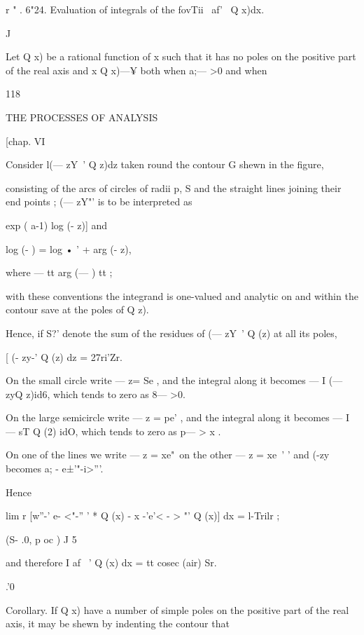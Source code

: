 r "  
.  6"24. Evaluation of integrals of the fovTii \ af'~ Q x)dx. 

J 

Let Q x) be a rational function of x such that it has no poles on the 
positive part of the real axis and x Q x)—¥  both when a;— >0 and when 



118 



THE PROCESSES OF ANALYSIS 



[chap. VI 



Consider l(— zY~'  Q z)dz taken round the contour G shewn in the figure, 



consisting of the arcs of circles of radii 
p, S and the straight lines joining their 
end points ; (— zY"'  is to be interpreted 
as 

exp  ( a-1) log (- z)] 
and 

log (-  ) = log •  ' +   arg (- z), 

where — tt   arg (—  )   tt ; 

with these conventions the integrand is 
one-valued and analytic on and within 
the contour save at the poles of Q  z). 

Hence, if S?' denote the sum of the 
residues of (— zY~'  Q (z) at all its poles, 




[ (- zy-' Q (z) dz = 27ri'Zr. 



On the small circle write — z= Se , and the integral along it becomes 
— I (— zyQ z)id6, which tends to zero as 8— >0. 



On the large semicircle write — z = pe' , and the integral along it becomes 
— I  — sT Q (2) idO, which tends to zero as p— > x . 

On one of the lines we write — z = xe"\ on the other — z = xe~' ' and 
(-zy~  becomes a; - e±'"-i>'''. 

Hence 

lim r [w''-' e- <"-'' ' * Q (x) - x -'e'< - > "' Q (x)] dx = l-Trilr ; 

(S- .0, p oc ) J 5 

and therefore I af ~'  Q (x) dx = tt cosec (air) Sr. 

.'0 

Corollary. If Q x) have a number of simple poles on the positive part 
of the real axis, it may be shewn by indenting the contour that 

